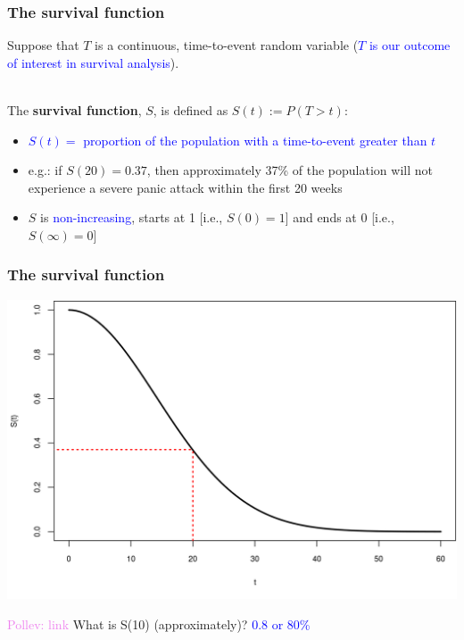 \documentclass[10pt,t]{beamer}
\begin{document}
\begin{frame}
\frametitle{The survival function}
Suppose that $T$ is a continuous, time-to-event random variable (\textcolor{blue}{$T$ is our outcome of interest in survival analysis}).
\\ ~\ 

The \textbf{survival function}, $S$, is defined as $S(t) := P(T > t)$:  

\medskip

\begin{itemize}
\item \textcolor{blue}{$S(t) = $ proportion of the population with a time-to-event greater than $t$}  

\medskip

\item e.g.: if $S(20) = 0.37$, then approximately 37\% of the population will not experience a severe panic attack within the first 20 weeks  

\medskip

\item $S$ is \textcolor{blue}{non-increasing}, starts at 1 [i.e., $S(0) = 1$] and ends at 0 [i.e., $S(\infty) = 0$]
\end{itemize}
\end{frame}

\begin{frame}
\frametitle{The survival function}
\includegraphics[height=0.8\textheight]{figs/survival_function.png}

\textcolor{violet}{Pollev: link} What is S(10) (approximately)? \pause \textcolor{blue}{0.8 or 80\%}

\end{frame}
\end{document}
